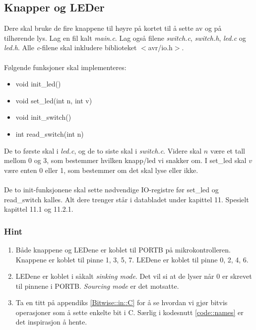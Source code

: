 \documentclass[11pt,a4paper]{article}
\begin{document}
\subsection{Knapper og LEDer}
Dere skal bruke de fire knappene til høyre på kortet til å sette av og på tilhørende lys. Lag en fil kalt \textit{main.c}. Lag også filene \textit{switch.c}, \textit{switch.h}, \textit{led.c} og \textit{led.h}. Alle \textit{c}-filene skal inkludere biblioteket $<$avr/io.h$>$.\\
\\
Følgende funksjoner skal implementeres:
\begin{itemize}
\item void init\_led()
\item void set\_led(int n, int v)
\item void init\_switch()
\item int read\_switch(int n)
\end{itemize}
De to første skal i \textit{led.c}, og de to siste skal i \textit{switch.c}. Videre skal $n$ være et tall mellom 0 og 3, som bestemmer hvilken knapp/led vi snakker om. I set\_led skal $v$ være enten 0 eller 1, som bestemmer om det skal lyse eller ikke.\\
\\
De to init-funksjonene skal sette nødvendige IO-registre før set\_led og read\_switch kalles. Alt dere trenger står i databladet under kapittel 11. Spesielt kapittel 11.1 og 11.2.1.
\subsubsection{Hint}
\begin{enumerate}
\item Både knappene og LEDene er koblet til PORTB på mikrokontrolleren. Knappene er koblet til pinne 1, 3, 5, 7. LEDene er koblet til pinne 0, 2, 4, 6.
\item LEDene er koblet i såkalt \textit{sinking mode}. Det vil si at de lyser når 0 er skrevet til pinnene i PORTB. \textit{Sourcing mode} er det motsatte.
\item Ta en titt på appendiks \ref{Bitwise::in::C} for å se hvordan vi gjør bitvis operasjoner som å sette enkelte bit i C. Særlig i kodesnutt \ref{code::names} er det inspirasjon å hente.
\end{enumerate}
\end{document}
